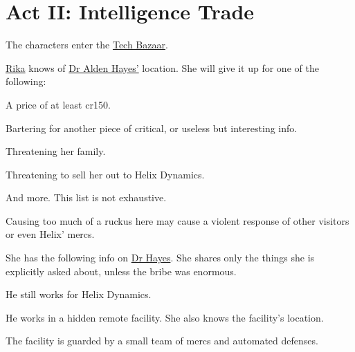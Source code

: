 \chapter{Act II: Intelligence Trade}
\label{ch:act2}
The characters enter the \hyperref[location:techbazaar]{Tech Bazaar}.
\par
\hyperref[char:rika]{Rika} knows of \hyperref[char:hayes]{Dr Alden Hayes'} location.
She will give it up for one of the following:
\begin{sitemize}
	\item A price of at least cr150.
	\item Bartering for another piece of critical, or useless but interesting info.
	\item Threatening her family.
	\item Threatening to sell her out to Helix Dynamics.
	\item And more.
		This list is not exhaustive.
\end{sitemize}

Causing too much of a ruckus here
	may cause a violent response of other visitors
	or even Helix' mercs.

She has the following info on \hyperref[char:hayes]{Dr Hayes}.
She shares only the things she is explicitly asked about,
	unless the bribe was enormous.
\begin{sitemize}
	\item He still works for Helix Dynamics.
	\item He works in a hidden remote facility.
		She also knows the facility's location.
	\item The facility is guarded by a small team of mercs and automated defenses.
\end{sitemize}
